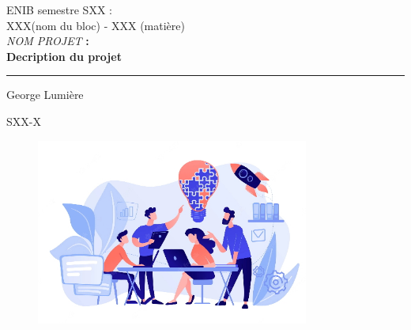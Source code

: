 \documentclass[a4paper, twoside]{article} %
\begin{document}
\begin{titlepage}
\begin{center}
ENIB semestre SXX : \\
XXX(nom du bloc) - XXX (matière)\\
\vspace{2cm}
\huge{\textsl{NOM PROJET}\textbf{ : \\
Decription du projet}}\\
\end{center}
\begin{center}
\rule{\linewidth}{1pt}
\end{center}

\begin{minipage}[t]{0.47\textwidth}
	{\large George Lumière}
\end{minipage}\hfill
\begin{minipage}[t]{0.47\textwidth}\raggedleft
	{\large SXX-X}
\end{minipage}

\vspace{2.5cm}

\begin{figure}[H]
	\centering \includegraphics[width=0.8\textwidth]{guardpage.jpg}
\end{figure}

\vspace{0.3cm}

\end{titlepage}

\tableofcontents
\listoffigures

\newpage


\end{document}

